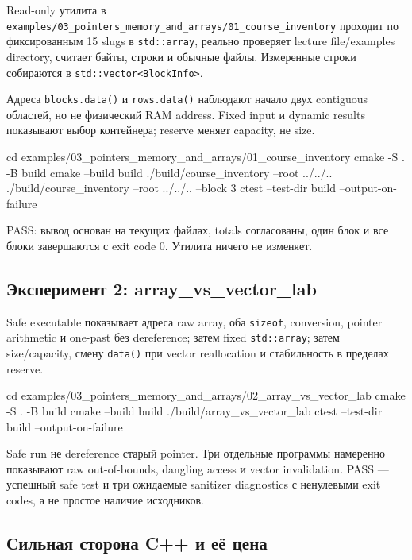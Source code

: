 Read-only утилита в
\texttt{examples/03\_pointers\_memory\_and\_arrays/01\_course\_inventory}
проходит по фиксированным 15 slugs в \texttt{std::array}, реально проверяет
lecture file/examples directory, считает байты, строки и обычные файлы.
Измеренные строки собираются в \texttt{std::vector<BlockInfo>}.

Адреса \texttt{blocks.data()} и \texttt{rows.data()} наблюдают начало двух
contiguous областей, но не физический RAM address. Fixed input и dynamic
results показывают выбор контейнера; reserve меняет capacity, не size.

\begin{shellcode}
cd examples/03_pointers_memory_and_arrays/01_course_inventory
cmake -S . -B build
cmake --build build
./build/course_inventory --root ../../..
./build/course_inventory --root ../../.. --block 3
ctest --test-dir build --output-on-failure
\end{shellcode}

PASS: вывод основан на текущих файлах, totals согласованы, один блок и все
блоки завершаются с exit code 0. Утилита ничего не изменяет.

\subsection{Эксперимент 2: array\_vs\_vector\_lab}

Safe executable показывает адреса raw array, оба \texttt{sizeof}, conversion,
pointer arithmetic и one-past без dereference; затем fixed
\texttt{std::array}; затем size/capacity, смену \texttt{data()} при vector
reallocation и стабильность в пределах reserve.

\begin{shellcode}
cd examples/03_pointers_memory_and_arrays/02_array_vs_vector_lab
cmake -S . -B build
cmake --build build
./build/array_vs_vector_lab
ctest --test-dir build --output-on-failure
\end{shellcode}

Safe run не dereference старый pointer. Три отдельные программы намеренно
показывают raw out-of-bounds, dangling access и vector invalidation. PASS ---
успешный safe test и три ожидаемые sanitizer diagnostics с ненулевыми exit
codes, а не простое наличие исходников.

\subsection{Сильная сторона C++ и её цена}

